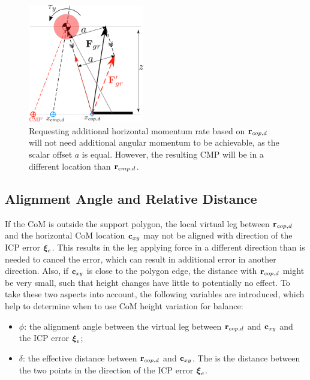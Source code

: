 \begin{figure}
\centering
\includegraphics[width=0.45\textwidth]{STYLESTUFF/2DControlStrategyViz.png}
\caption{Requesting additional horizontal momentum rate based on $\mathbf{r}_{cop,d}$ will not need additional angular momentum to be achievable, as the scalar offset $a$ is equal. However, the resulting \ac{CMP} will be in a different location than $\mathbf{r}_{cmp,d}$.}
\label{fig:rcopdvsrcmpd}
\end{figure}
\subsection{Alignment Angle and Relative Distance}
If the \ac{CoM} is outside the support polygon, the local virtual leg between $\mathbf{r}_{cop,d}$ and the horizontal \ac{CoM} location $\mathbf{c}_{xy}$ may not be aligned with direction of the \ac{ICP} error $\boldsymbol{\xi}_e$. This results in the leg applying force in a different direction than is needed to cancel the error, which can result in additional error in another direction. Also, if $\mathbf{c}_{xy}$ is close to the polygon edge, the distance with $\mathbf{r}_{cop,d}$ might be very small, such that height changes have little to potentially no effect. To take these two aspects into account, the following variables are introduced, which help to determine when to use \ac{CoM} height variation for balance:
\begin{itemize}
	\item $\phi$: the alignment angle between the virtual leg between $\mathbf{r}_{cop,d}$ and $\mathbf{c}_{xy}$ and the \ac{ICP} error $\boldsymbol{\xi}_e$;
	\item $\delta$: the effective distance between $\mathbf{r}_{cop,d}$ and $\mathbf{c}_{xy}$. The is the distance between the two points in the direction of the \ac{ICP} error $\boldsymbol{\xi}_e$.
\end{itemize}

